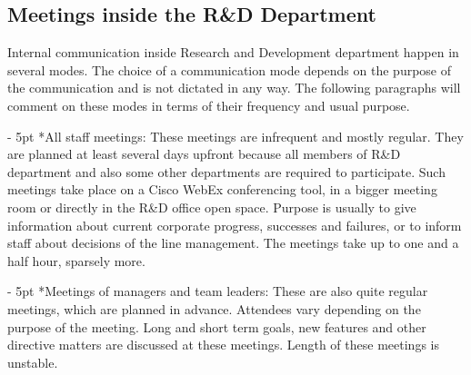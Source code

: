\documentclass[11pt,singleside]{myfithesis2}
\makeatletter
\renewcommand\paragraph{
   \vspace{-10pt}
   \@startsection{paragraph}{4}{0mm}
      {\baselineskip}
      {- 5pt}
      {\normalfont\normalsize\bfseries}
}
\makeatother
\begin{document}
		\subsection{Meetings inside the R\&D Department}\label{rndMeetings}
Internal communication inside Research and Development department happen in several modes. The choice of a communication mode depends on the purpose of the communication and is not dictated in any way. The following paragraphs will comment on these modes in terms of their frequency and usual purpose.

\paragraph*{All staff meetings: } These meetings are infrequent and mostly regular. They are planned at least several days upfront because all members of R\&D department and also some other departments are required to participate. Such meetings take place on a Cisco WebEx conferencing tool, in a bigger meeting room or directly in the R\&D office open space. Purpose is usually to give information about current corporate progress, successes and failures, or to inform staff about decisions of the line management. The meetings take up to one and a half hour, sparsely more.

\paragraph*{Meetings of managers and team leaders: } These are also quite regular meetings, which are planned in advance. Attendees vary depending on the purpose of the meeting. Long and short term goals, new features and other directive matters are discussed at these meetings. Length of these meetings is unstable.
\end{document}
